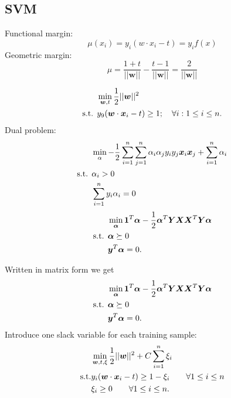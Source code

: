 \documentclass[a4paper,9pt]{extarticle}
\begin{document}
\begin{multicols*}{2}
\section{SVM}
Functional margin:
\begin{equation*}
	\mu(x_{i})=y_{i}(w\cdot x_{i}-t)=y_{i}f(x)
\end{equation*}
Geometric margin:
\begin{equation*}
	\mu=\frac{1+t}{\lvert\lvert\bm{w}\rvert\rvert}-\frac{t-1}{\lvert\lvert\bm{w}\rvert\rvert}=\frac{2}{\lvert\lvert\bm{w}\rvert\rvert}
\end{equation*}
\begin{riquadro}
	\begin{align*}
		&\min_{\bm{w},t}\frac{1}{2}\lvert\lvert\bm{w}\rvert\rvert^{2}\\
		\text{s.t. }&y_{9}(\bm{w}\cdot\bm{x}_{i}-t)\geq 1;\quad\forall i:1\leq i\leq n.
	\end{align*}
	Dual problem:
	\begin{align*}
		&\min_{\alpha}-\frac{1}{2}\sum_{i=1}^{n}\sum_{j=1}^{n}\alpha_{i}\alpha_{j}y_{i}y_{j}\bm{x}_{i}\bm{x}_{j}+\sum_{i=1}^{n}\alpha_{i}\\
		\text{s.t. }&\alpha_{i}>0\\
		&\sum_{i=1}^{n}y_{i}\alpha_{i}=0
	\end{align*}
\begin{align*}
	&\min_{\bm{\alpha}}\mathbf{1}^{T}\bm{\alpha}-\frac{1}{2}\bm{\alpha}^{T}\bm{YXX}^{T}\bm{Y\alpha}\\
	\text{s.t. }&\bm{\alpha}\succeq0\\
	&\bm{y}^{T}\bm{\alpha}=0.
\end{align*}
\end{riquadro}
	Written in matrix form we get
\begin{align*}
	&\min_{\bm{\alpha}}\mathbf{1}^{T}\bm{\alpha}-\frac{1}{2}\bm{\alpha}^{T}\bm{YXX}^{T}\bm{Y\alpha}\\
	\text{s.t. }&\bm{\alpha}\succeq0\\
	&\bm{y}^{T}\bm{\alpha}=0.
\end{align*}
Introduce one slack variable for each training sample:
\begin{align*}
	&\min_{\bm{w},t,\xi}\frac{1}{2}\lvert\lvert\bm{w}\rvert\rvert^{2}+C\sum_{i=1}^{n}\xi_{i}\\
	\text{s.t.}&y_{i}(\bm{w}\cdot \bm{x}_{i}-t)\geq 1-\xi_{i}\qquad\forall1\leq i\leq n\\
	&\xi_{i}\geq0\qquad\forall1\leq i\leq n.
\end{align*}

\end{multicols*}
\end{document}
